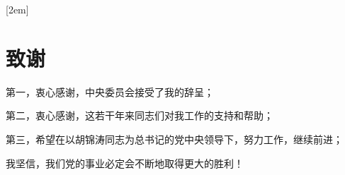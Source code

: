 
[2em]{\vspace{.5\baselineskip}\xiaosan\song}
             {\prechaptername\CJKnumber{\thecontentslabel}\postchaptername\qquad}{} 
             {}                            %

\chapter*{致\qquad 谢}

第一，衷心感谢，中央委员会接受了我的辞呈；

第二，衷心感谢，这若干年来同志们对我工作的支持和帮助；

第三，希望在以胡锦涛同志为总书记的党中央领导下，努力工作，继续前进；

我坚信，我们党的事业必定会不断地取得更大的胜利！